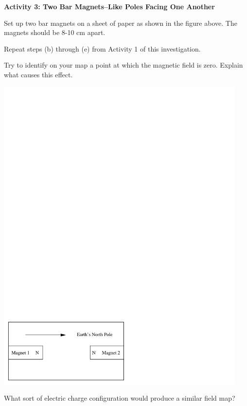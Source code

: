 \textbf{Activity 3: Two Bar Magnets--Like Poles Facing One Another}

\begin{enumerate}[labparts]
\begin{minipage}{0.5\textwidth}
\item Set up two bar magnets on a sheet of paper as shown in the figure
above. The magnets should be 8-10 cm apart.
\item Repeat steps (b) through (e) from Activity 1 of this investigation.
\item Try to identify on your map a point at which the magnetic field is
zero. Explain what causes this effect.
\vspace{5mm}
\end{minipage}
\begin{minipage}{0.49\textwidth}
\hspace{0.05\textwidth}\includegraphics[trim={0 0 3.5mm 0},clip,width=0.94\textwidth]{magnetism_field_perm_mag/magnetism_2_fig_3.pdf}
\end{minipage}
\answerspace{30mm}


\item What sort of electric charge configuration would produce a similar
field map?\vspace{15mm}
\end{enumerate}

